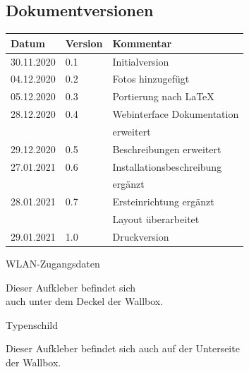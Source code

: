 \documentclass[a4paper,10pt]{article}
\begin{document}
\begin{multicols*}{2}
	\section{Dokumentversionen}
	\begin{tabular}{lll}
		\toprule
		Datum      & Version & Kommentar                  \\
		\midrule
		30.11.2020 & 0.1     & Initialversion             \\
		04.12.2020 & 0.2     & Fotos hinzugefügt          \\
		05.12.2020 & 0.3     & Portierung nach \LaTeX     \\
		28.12.2020 & 0.4     & Webinterface Dokumentation \\
		           &         & erweitert                  \\
		29.12.2020 & 0.5     & Beschreibungen erweitert   \\
		27.01.2021 & 0.6     & Installationsbeschreibung  \\
		           &         & ergänzt                    \\
		28.01.2021 & 0.7     & Ersteinrichtung ergänzt    \\
		           &         & Layout überarbeitet        \\
		29.01.2021 & 1.0     & Druckversion               \\
		\bottomrule
	\end{tabular}
	\newpage
	\pagestyle{empty}
	\null
	\vfill
	WLAN-Zugangsdaten
	\begin{tcolorbox}[width=4.2cm,height=2.7cm, boxrule=0.25mm]

	\end{tcolorbox}
	Dieser Aufkleber befindet sich\\ auch unter dem Deckel der Wallbox.
	\columnbreak

	\null
	\vfill
	Typenschild
	\begin{tcolorbox}[width=7.8cm,height=4.1cm, boxrule=0.25mm]

	\end{tcolorbox}
	Dieser Aufkleber befindet sich auch auf der Unterseite\\ der Wallbox.
\end{multicols*}

\end{document}
